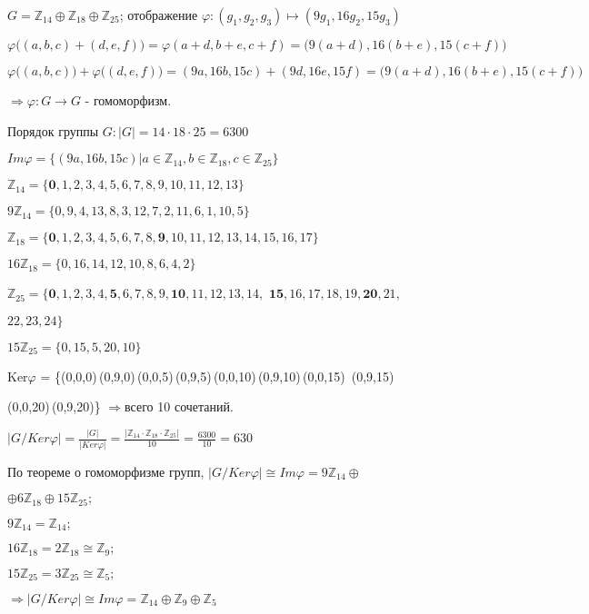 \documentclass[utf8,14pt,a4paper,oneside,russian]{book}
\begin{document}
	$G=\mathbb {Z}_{14}\oplus\mathbb {Z}_{18}\oplus\mathbb {Z}_{25}$; отображение $\varphi:(g_{1},g_{2},g_{3})\mapsto(9g_{1},16g_{2},15g_{3})$
	
	$\varphi \big((a,b,c)+(d,e,f)\big)=\varphi(a+d,b+e,c+f)=\big(9(a+d),16(b+e),15(c+f)\big)$
	
	$\varphi \big((a,b,c)\big)+\varphi\big((d,e,f)\big)=(9a,16b,15c)+(9d,16e,15f)=\big(9(a+d),16(b+e),15(c+f)\big)$
	
	$\Rightarrow\varphi:G \rightarrow G$ - гомоморфизм.
	
	Порядок группы $G:|G|=14\cdot18\cdot25=6300$
	
	$Im\varphi=\{(9a,16b,15c)\big|a\in\mathbb {Z}_{14},b\in\mathbb {Z}_{18},c\in\mathbb {Z}_{25}\}$
	
	$\mathbb {Z}_{14}=\{\textbf{0},1,2,3,4,5,6,7,8,9,10,11,12,13\}$
	
	$9\mathbb {Z}_{14}=\{0,9,4,13,8,3,12,7,2,11,6,1,10,5\}$
	
	$\mathbb {Z}_{18}=\{\textbf{0},1,2,3,4,5,6,7,8,\textbf{9},10,11,12,13,14,15,16,17\}$
	
	$16\mathbb {Z}_{18}=\{0,16,14,12,10,8,6,4,2\}$
	
	$\mathbb {Z}_{25}=\{\textbf{0},1,2,3,4,\textbf{5},6,7,8,9,\textbf{10},11,12,13,14,$
	$\textbf{15},16,17,18,19,\textbf{20},21,$
	
	$22,23,24\}$
	
	$15\mathbb {Z}_{25}=\{0,15,5,20,10\}$
	
	Ker$\varphi$ = \{(0,0,0)\,(0,9,0)\,(0,0,5)\,(0,9,5)\,(0,0,10)\,(0,9,10)\,(0,0,15)\,
	(0,9,15)\,
	
	(0,0,20)\,(0,9,20)\} $\Rightarrow $всего 10 сочетаний.
	
	$|G/Ker\varphi|=\frac{|G|}{|Ker\varphi|}=\frac{|\mathbb {Z}_{14}\cdot\mathbb {Z}_{18}\cdot\mathbb {Z}_{25}|}{10}=\frac{6300}{10}=630$
	
	По теореме о гомоморфизме групп, $|G/Ker\varphi|\cong Im\varphi =9\mathbb {Z}_{14}\oplus$
	
	$\oplus6\mathbb {Z}_{18}\oplus15\mathbb {Z}_{25};$
	
	$9\mathbb {Z}_{14}=\mathbb {Z}_{14};$
	
	$16\mathbb {Z}_{18}=2\mathbb{Z}_{ 18}\cong\mathbb{Z}_{9};$
	
	$15\mathbb {Z}_{25}=3\mathbb {Z}_{25}\cong\mathbb {Z}_{5};$
	
	$\Rightarrow|G/Ker\varphi|\cong Im\varphi =\mathbb {Z}_{14}\oplus\mathbb {Z}_{9}\oplus\mathbb {Z}_{5}$
	
	\newpage
	
\end{document}
